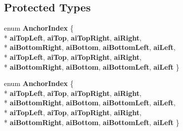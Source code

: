 \subsection*{Protected Types}
\begin{DoxyCompactItemize}
\item 
enum {\bfseries Anchor\+Index} \{ \\*
{\bfseries ai\+Top\+Left}, 
{\bfseries ai\+Top}, 
{\bfseries ai\+Top\+Right}, 
{\bfseries ai\+Right}, 
\\*
{\bfseries ai\+Bottom\+Right}, 
{\bfseries ai\+Bottom}, 
{\bfseries ai\+Bottom\+Left}, 
{\bfseries ai\+Left}, 
\\*
{\bfseries ai\+Top\+Left}, 
{\bfseries ai\+Top}, 
{\bfseries ai\+Top\+Right}, 
{\bfseries ai\+Right}, 
\\*
{\bfseries ai\+Bottom\+Right}, 
{\bfseries ai\+Bottom}, 
{\bfseries ai\+Bottom\+Left}, 
{\bfseries ai\+Left}
 \}\hypertarget{class_q_c_p_item_text_a14a84e58f72519c8ae1d7a4a1dd23f21}{}\label{class_q_c_p_item_text_a14a84e58f72519c8ae1d7a4a1dd23f21}

\item 
enum {\bfseries Anchor\+Index} \{ \\*
{\bfseries ai\+Top\+Left}, 
{\bfseries ai\+Top}, 
{\bfseries ai\+Top\+Right}, 
{\bfseries ai\+Right}, 
\\*
{\bfseries ai\+Bottom\+Right}, 
{\bfseries ai\+Bottom}, 
{\bfseries ai\+Bottom\+Left}, 
{\bfseries ai\+Left}, 
\\*
{\bfseries ai\+Top\+Left}, 
{\bfseries ai\+Top}, 
{\bfseries ai\+Top\+Right}, 
{\bfseries ai\+Right}, 
\\*
{\bfseries ai\+Bottom\+Right}, 
{\bfseries ai\+Bottom}, 
{\bfseries ai\+Bottom\+Left}, 
{\bfseries ai\+Left}
 \}\hypertarget{class_q_c_p_item_text_a14a84e58f72519c8ae1d7a4a1dd23f21}{}\label{class_q_c_p_item_text_a14a84e58f72519c8ae1d7a4a1dd23f21}

\end{DoxyCompactItemize}
